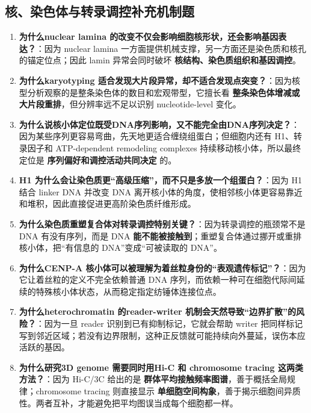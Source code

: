\documentclass[12pt,fontset=none]{ctexart}
\begin{document}
\subsection*{核、染色体与转录调控补充机制题}
\begin{enumerate}
\item \textbf{为什么nuclear lamina 的改变不仅会影响细胞核形状，还会影响基因表达？}：因为 nuclear lamina 一方面提供机械支撑，另一方面还是染色质和核孔的锚定位点；因此 lamin 异常会同时破坏 \textbf{核结构、染色质组织和基因调控}。

\item \textbf{为什么karyotyping 适合发现大片段异常，却不适合发现点突变？}：因为核型分析观察的是整条染色体的数目和宏观带型，它擅长看 \textbf{整条染色体增减或大片段重排}，但分辨率远不足以识别 nucleotide-level 变化。

\item \textbf{为什么说核小体定位既受DNA序列影响，又不能完全由DNA序列决定？}：因为某些序列更容易弯曲，先天地更适合缠绕组蛋白；但细胞内还有 H1、转录因子和 ATP-dependent remodeling complexes 持续移动核小体，所以最终定位是 \textbf{序列偏好和调控活动共同决定} 的。

\item \textbf{H1 为什么会让染色质更“高级压缩”，而不只是多放一个组蛋白？}：因为 H1 结合 linker DNA 并改变 DNA 离开核小体的角度，使相邻核小体更容易靠近和堆积，因此直接促进更高阶染色质纤维形成。

\item \textbf{为什么染色质重塑复合体对转录调控特别关键？}：因为转录调控的瓶颈常不是 DNA 有没有序列，而是 DNA \textbf{能不能被接触到}；重塑复合体通过挪开或重排核小体，把“有信息的 DNA”变成“可被读取的 DNA”。

\item \textbf{为什么CENP-A 核小体可以被理解为着丝粒身份的“表观遗传标记”？}：因为它让着丝粒的定义不完全依赖普通 DNA 序列，而依赖一种可在细胞代际间延续的特殊核小体状态，从而稳定指定纺锤体连接位点。

\item \textbf{为什么heterochromatin 的reader-writer 机制会天然导致“边界扩散”的风险？}：因为一旦 reader 识别到已有抑制标记，它就会帮助 writer 把同样标记写到邻近区域；若没有边界限制，这种正反馈就可能持续向外蔓延，误伤本应活跃的基因。

\item \textbf{为什么研究3D genome 需要同时用Hi-C 和 chromosome tracing 这两类方法？}：因为 Hi-C/3C 给出的是 \textbf{群体平均接触频率图谱}，善于概括全局规律；chromosome tracing 则直接显示 \textbf{单细胞空间构象}，善于揭示细胞间异质性。两者互补，才能避免把平均图误当成每个细胞都一样。


\end{enumerate}
\end{document}

